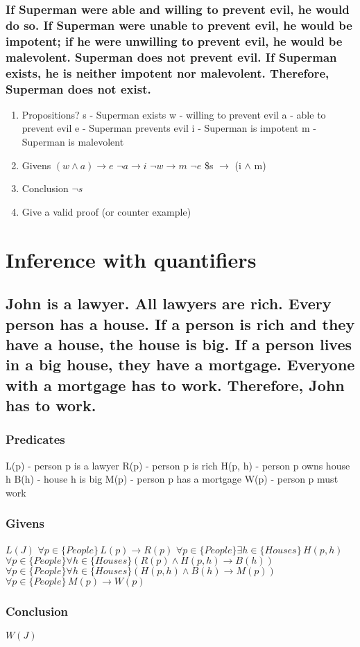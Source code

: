 \documentclass[11pt]{article}
\begin{document}
\subsubsection{If Superman were able and willing to prevent evil, he would do so.  If Superman were unable to prevent evil, he would be impotent; if he were unwilling to prevent evil, he would be malevolent. Superman does not prevent evil. If Superman exists, he is neither impotent nor malevolent. Therefore, Superman does not exist.}
\label{sec:org5874618}
\begin{enumerate}
\item Propositions?
\label{sec:org61fa5d2}
s - Superman exists
w - willing to prevent evil
a - able to prevent evil
e - Superman prevents evil
i - Superman is impotent
m - Superman is malevolent
\item Givens
\label{sec:org9c201fc}
\((w \land a) \rightarrow e\)
\(\lnot a \rightarrow i\)
\(\lnot w \rightarrow m\)
\(\lnot e\)
\$s \(\rightarrow\) (\lnot i \(\land\) \lnot m)
\item Conclusion
\label{sec:org0b503cc}
\(\lnot s\)
\item Give a valid proof (or counter example)
\label{sec:org8cdad5b}
\end{enumerate}

\section{Inference with quantifiers}
\label{sec:org1ffcbde}
\subsection{John is a lawyer. All lawyers are rich. Every person has a house. If a person is rich and they have a house, the house is big. If a person lives in a big house, they have a mortgage. Everyone with a mortgage has to work.  Therefore, John has to work.}
\label{sec:org581e50e}
\subsubsection{Predicates}
\label{sec:org12407ad}
L(p) - person p is a lawyer
R(p) - person p is rich
H(p, h) - person p owns house h
B(h) - house h is big
M(p) - person p has a mortgage
W(p) - person p must work
\subsubsection{Givens}
\label{sec:orgf50983e}
\(L(J)\)
\(\forall p \in \{People\} \, L(p) \rightarrow R(p)\)
\(\forall p \in \{People\} \exists h \in \{Houses\} \, H(p,h)\)
\(\forall p \in \{People\} \forall h \in \{Houses\} (R(p) \land H(p, h) \rightarrow B(h))\)
\(\forall p \in \{People\} \forall h \in \{Houses\} (H(p, h) \land B(h) \rightarrow M(p))\)
\(\forall p \in \{People\} \, M(p) \rightarrow W(p)\)
\subsubsection{Conclusion}
\label{sec:org78e7139}
\(W(J)\)
\end{document}
